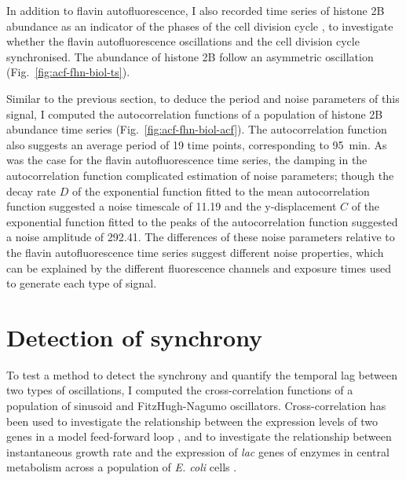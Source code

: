 In addition to flavin autofluorescence, I also recorded time series of histone 2B abundance as an indicator of the phases of the cell division cycle \parencite{garmendia-torresMultipleInputsEnsure2018}, to investigate whether the flavin autofluorescence oscillations and the cell division cycle synchronised.
The abundance of histone 2B follow an asymmetric oscillation (Fig.\ \ref{fig:acf-fhn-biol-ts}).

Similar to the previous section, to deduce the period and noise parameters of this signal, I computed the autocorrelation functions of a population of histone 2B abundance time series (Fig.\ \ref{fig:acf-fhn-biol-acf}).
The autocorrelation function also suggests an average period of 19 time points, corresponding to \SI{95}{\minute}.
As was the case for the flavin autofluorescence time series, the damping in the autocorrelation function complicated estimation of noise parameters; though the decay rate $D$ of the exponential function fitted to the mean autocorrelation function suggested a noise timescale of 11.19 and the y-displacement $C$ of the exponential function fitted to the peaks of the autocorrelation function suggested a noise amplitude of 292.41.
The differences of these noise parameters relative to the flavin autofluorescence time series suggest different noise properties, which can be explained by the different fluorescence channels and exposure times used to generate each type of signal.


\section{Detection of synchrony}
\label{sec:analysis-correlation}

To test a method to detect the synchrony and quantify the temporal lag between two types of oscillations, I computed the cross-correlation functions of a population of sinusoid and FitzHugh-Nagumo oscillators.
Cross-correlation has been used to investigate the relationship between the expression levels of two genes in a model feed-forward loop \parencite{dunlopRegulatoryActivityRevealed2008},
and to investigate the relationship between instantaneous growth rate and the expression of \textit{lac} genes of enzymes in central metabolism across a population of \textit{E. coli} cells \parencite{kivietStochasticityMetabolismGrowth2014}.

